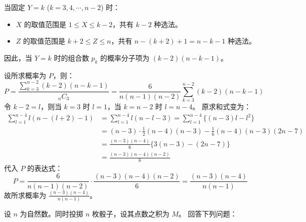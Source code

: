\begin{questions}
\begin{parts}
\begin{solution}
        当固定 $Y=k$ ($k=3, 4, \cdots, n-2$) 时：
        \begin{itemize}
            \item $X$ 的取值范围是 $1 \le X \le k-2$，共有 $k-2$ 种选法。
            \item $Z$ 的取值范围是 $k+2 \le Z \le n$，共有 $n-(k+2)+1 = n-k-1$ 种选法。
        \end{itemize}
        因此，当 $Y=k$ 时的组合数 $p_k$ 的概率分子项为 $(k-2)(n-k-1)$。
        
        设所求概率为 $P$，则：
        \[ P = \frac{\sum_{k=3}^{n-2} (k-2)(n-k-1)}{{}_nC_3} = \frac{6}{n(n-1)(n-2)} \sum_{k=3}^{n-2} (k-2)(n-k-1)  \]
        令 $k-2 = l$，则当 $k=3$ 时 $l=1$，当 $k=n-2$ 时 $l=n-4$。
        原求和式变为：
        \begin{align*}
            \sum_{l=1}^{n-4} l(n-(l+2)-1) &= \sum_{l=1}^{n-4} l(n-l-3) = \sum_{l=1}^{n-4} \{ (n-3)l - l^2 \} \\
            &= (n-3) \cdot \frac{1}{2}(n-4)(n-3) - \frac{1}{6}(n-4)(n-3)(2n-7) \\
            &= \frac{(n-3)(n-4)}{6} \{ 3(n-3) - (2n-7) \} \\
            &= \frac{(n-3)(n-4)(n-2)}{6} 
        \end{align*}
        代入 $P$ 的表达式：
        \[ P = \frac{6}{n(n-1)(n-2)} \cdot \frac{(n-3)(n-4)(n-2)}{6} = \frac{(n-3)(n-4)}{n(n-1)}  \]
        故所求概率为 $\frac{(n-3)(n-4)}{n(n-1)}$。
    \end{solution}
\end{parts}

\question
设 $n$ 为自然数。同时投掷 $n$ 枚骰子，设其点数之积为 $M$。
回答下列问题：

\end{questions}
